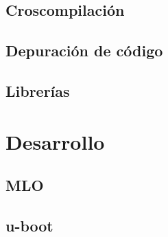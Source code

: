 \subsection{Croscompilación}


\subsection{Depuración de código}
\subsection{Librerías}

\section{Desarrollo}
\subsection{MLO}
\subsection{u-boot}
%
%
%
%
%
%
%
%
%
%
%
%
%
%
%
%

